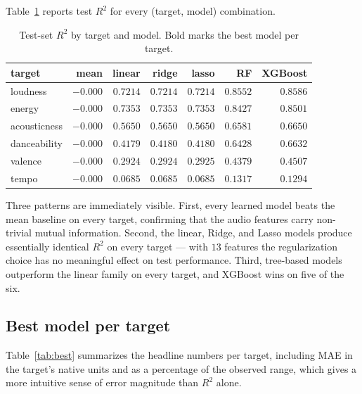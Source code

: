 \documentclass[11pt]{article}
\begin{document}
Table~\ref{tab:r2-pivot} reports test $R^2$ for every (target, model) combination.

\begin{table}[H]
\centering
\caption{Test-set $R^2$ by target and model. Bold marks the best model per target.}
\label{tab:r2-pivot}
\small
\begin{tabular}{lrrrrrr}
\toprule
\textbf{target} & \textbf{mean} & \textbf{linear} & \textbf{ridge} & \textbf{lasso} & \textbf{RF} & \textbf{XGBoost} \\
\midrule
loudness     & $-0.000$ & $0.7214$ & $0.7214$ & $0.7214$ & $0.8552$ & $\mathbf{0.8586}$ \\
energy       & $-0.000$ & $0.7353$ & $0.7353$ & $0.7353$ & $0.8427$ & $\mathbf{0.8501}$ \\
acousticness & $-0.000$ & $0.5650$ & $0.5650$ & $0.5650$ & $0.6581$ & $\mathbf{0.6650}$ \\
danceability & $-0.000$ & $0.4179$ & $0.4180$ & $0.4180$ & $0.6428$ & $\mathbf{0.6632}$ \\
valence      & $-0.000$ & $0.2924$ & $0.2924$ & $0.2925$ & $0.4379$ & $\mathbf{0.4507}$ \\
tempo        & $-0.000$ & $0.0685$ & $0.0685$ & $0.0685$ & $\mathbf{0.1317}$ & $0.1294$ \\
\bottomrule
\end{tabular}
\end{table}

Three patterns are immediately visible. First, every learned model beats the mean baseline on every target, confirming that the audio features carry non-trivial mutual information. Second, the linear, Ridge, and Lasso models produce essentially identical $R^2$ on every target --- with $13$ features the regularization choice has no meaningful effect on test performance. Third, tree-based models outperform the linear family on every target, and XGBoost wins on five of the six.

\subsection{Best model per target}

Table~\ref{tab:best} summarizes the headline numbers per target, including MAE in the target's native units and as a percentage of the observed range, which gives a more intuitive sense of error magnitude than $R^2$ alone.
\end{document}

